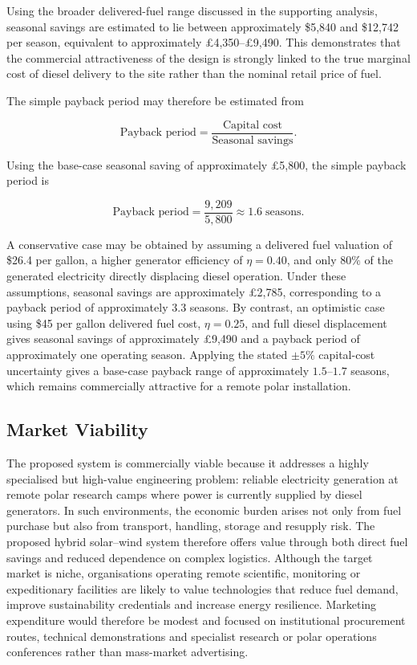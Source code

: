 \documentclass[11pt,a4paper]{article}
\begin{document}
Using the broader delivered-fuel range discussed in the supporting analysis,
seasonal savings are estimated to lie between approximately
\$5{,}840 and \$12{,}742 per season, equivalent to approximately
£4{,}350--£9{,}490. This demonstrates that the commercial attractiveness of
the design is strongly linked to the true marginal cost of diesel delivery to
the site rather than the nominal retail price of fuel.

The simple payback period may therefore be estimated from

\begin{equation}
\text{Payback period} =
\frac{\text{Capital cost}}{\text{Seasonal savings}}.
\end{equation}

Using the base-case seasonal saving of approximately £5{,}800, the simple
payback period is

\begin{equation}
\text{Payback period} =
\frac{9{,}209}{5{,}800}
\approx 1.6 \;\text{seasons}.
\end{equation}

A conservative case may be obtained by assuming a delivered fuel valuation of
\$26.4 per gallon, a higher generator efficiency of $\eta=0.40$, and only
$80\%$ of the generated electricity directly displacing diesel operation.
Under these assumptions, seasonal savings are approximately £2{,}785,
corresponding to a payback period of approximately $3.3$ seasons. By
contrast, an optimistic case using \$45 per gallon delivered fuel cost,
$\eta=0.25$, and full diesel displacement gives seasonal savings of
approximately £9{,}490 and a payback period of approximately one operating
season. Applying the stated $\pm 5\%$ capital-cost uncertainty gives a
base-case payback range of approximately $1.5$--$1.7$ seasons, which remains
commercially attractive for a remote polar installation.

\subsection{Market Viability}

The proposed system is commercially viable because it addresses a highly
specialised but high-value engineering problem: reliable electricity
generation at remote polar research camps where power is currently supplied
by diesel generators. In such environments, the economic burden arises not
only from fuel purchase but also from transport, handling, storage and
resupply risk. The proposed hybrid solar--wind system therefore offers value
through both direct fuel savings and reduced dependence on complex logistics.
Although the target market is niche, organisations operating remote
scientific, monitoring or expeditionary facilities are likely to value
technologies that reduce fuel demand, improve sustainability credentials and
increase energy resilience. Marketing expenditure would therefore be modest
and focused on institutional procurement routes, technical demonstrations and
specialist research or polar operations conferences rather than mass-market
advertising.
\end{document}
